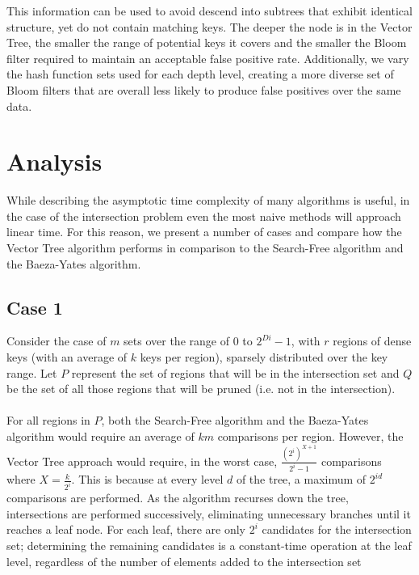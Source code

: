 \documentclass[11pt,letterpaper]{article}
\begin{document}
This information can be used to avoid descend into subtrees that
exhibit identical structure, yet do not contain matching keys. The
deeper the node is in the Vector Tree, the smaller the range of
potential keys it covers and the smaller the Bloom filter required to
maintain an acceptable false positive rate. Additionally, we vary the
hash function sets used for each depth level, creating a more diverse
set of Bloom filters that are overall less likely to produce false
positives over the same data.

\section{Analysis}

While describing the asymptotic time complexity of many algorithms is useful,
in the case of the intersection problem even the most naive methods will
approach linear time.  For this reason, we present a number of cases and
compare how the Vector Tree algorithm performs in comparison to the Search-Free
algorithm and the Baeza-Yates algorithm.

\subsection{Case 1}
Consider the case of $m$ sets over the range of $0$ to $2^{Di} - 1$,
with $r$ regions of dense keys (with an average of $k$ keys per region),
sparsely distributed over the key range.  Let $P$ represent the set of
regions that will be in the intersection set and $Q$ be the set of all those
regions that will be pruned (i.e. not in the intersection).

\paragraph{}
For all regions in $P$, both the Search-Free algorithm and the
Baeza-Yates algorithm would require an average of $km$ comparisons
per region.  However, the Vector Tree approach would require, in the
worst case, $\frac{(2^i)^{X+1}}{2^i-1}$ comparisons where $X=\frac{k}{2^i}$.
This is because at every level $d$ of the tree, a maximum of $2^{id}$
comparisons are performed.  As the algorithm recurses down the tree,
intersections are performed successively, eliminating unnecessary branches
until it reaches a leaf node.  For each leaf, there are only $2^i$ candidates for
the intersection set; determining the remaining candidates is a constant-time
operation at the leaf level, regardless of the number of elements added to the
intersection set
\end{document}
